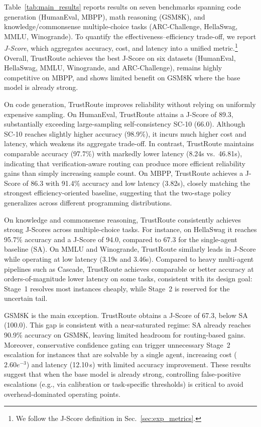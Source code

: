 \documentclass[acmsmall,screen,review,anonymous]{acmart}
\begin{document}
Table~\ref{tab:main_results} reports results on seven benchmarks spanning code generation (HumanEval, MBPP), math reasoning (GSM8K), and knowledge/commonsense multiple-choice tasks (ARC-Challenge, HellaSwag, MMLU, Winogrande).
To quantify the effectiveness--efficiency trade-off, we report \emph{J-Score}, which aggregates accuracy, cost, and latency into a unified metric.\footnote{We follow the J-Score definition in Sec.~\ref{sec:exp_metrics}.}
Overall, TrustRoute achieves the best J-Score on six datasets (HumanEval, HellaSwag, MMLU, Winogrande, and ARC-Challenge), remains highly competitive on MBPP, and shows limited benefit on GSM8K where the base model is already strong.

On code generation, TrustRoute improves reliability without relying on uniformly expensive sampling.
On HumanEval, TrustRoute attains a J-Score of 89.3, substantially exceeding large-sampling self-consistency SC-10 (66.0).
Although SC-10 reaches slightly higher accuracy (98.9\%), it incurs much higher cost and latency, which weakens its aggregate trade-off.
In contrast, TrustRoute maintains comparable accuracy (97.7\%) with markedly lower latency (8.24s vs.\ 46.81s), indicating that verification-aware routing can produce more efficient reliability gains than simply increasing sample count.
On MBPP, TrustRoute achieves a J-Score of 86.3 with 91.4\% accuracy and low latency (3.82s), closely matching the strongest efficiency-oriented baseline, suggesting that the two-stage policy generalizes across different programming distributions.

On knowledge and commonsense reasoning, TrustRoute consistently achieves strong J-Scores across multiple-choice tasks.
For instance, on HellaSwag it reaches 95.7\% accuracy and a J-Score of 94.0, compared to 67.3 for the single-agent baseline (SA).
On MMLU and Winogrande, TrustRoute similarly leads in J-Score while operating at low latency (3.19s and 3.46s).
Compared to heavy multi-agent pipelines such as Cascade, TrustRoute achieves comparable or better accuracy at orders-of-magnitude lower latency on some tasks, consistent with its design goal: Stage~1 resolves most instances cheaply, while Stage~2 is reserved for the uncertain tail.

GSM8K is the main exception.
TrustRoute obtains a J-Score of 67.3, below SA (100.0).
This gap is consistent with a near-saturated regime: SA already reaches 90.9\% accuracy on GSM8K, leaving limited headroom for routing-based gains.
Moreover, conservative confidence gating can trigger unnecessary Stage~2 escalation for instances that are solvable by a single agent, increasing cost ($2.60e^{-3}$) and latency (12.10\,s) with limited accuracy improvement.
These results suggest that when the base model is already strong, controlling false-positive escalations (e.g., via calibration or task-specific thresholds) is critical to avoid overhead-dominated operating points.
\end{document}
